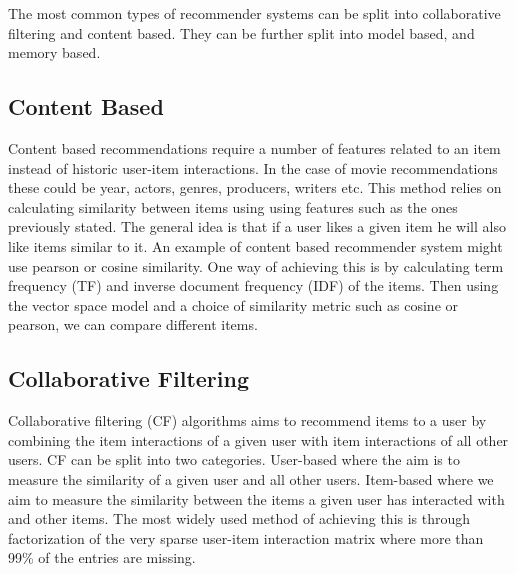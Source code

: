 The most common types of recommender systems can be split into collaborative filtering and content based. They can be further split into model based, and memory based.

\subsection{Content Based}
Content based recommendations require a number of features related to an item instead of historic user-item interactions. In the case of movie recommendations these could be year, actors, genres, producers, writers etc.
This method relies on calculating similarity between items using using features such as the ones previously stated.
The general idea is that if a user likes a given item he will also like items similar to it. An example of content based recommender system might use pearson or cosine similarity. One way of achieving this is by calculating term frequency (TF) and inverse document frequency (IDF) of the items. Then using the vector space model and a choice of similarity metric such as cosine or pearson, we can compare different items.

\subsection{Collaborative Filtering}
Collaborative filtering (CF) algorithms aims to recommend items to a user by combining the item interactions of a given user with item interactions of all other users. CF can be split into two categories. User-based where the aim is to measure the similarity of a given user and all other users. Item-based where we aim to measure the similarity between the items a given user has interacted with and other items.
The most widely used method of achieving this is through factorization of the very sparse user-item interaction matrix where more than 99\% of the entries are missing.

